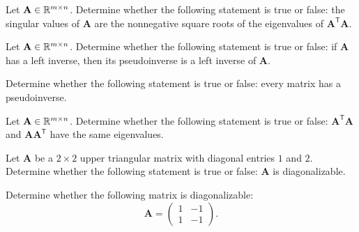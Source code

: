 \documentclass[11pt,oneside]{article}
\begin{document}
\begin{problem}
Let $\mathbf A\in\mathbb{R}^{m\times n}$. Determine whether the following statement is true or false: the singular values of $\mathbf A$ are the nonnegative square roots of the eigenvalues of $\mathbf A^{\mathsf T}\mathbf A$.
\end{problem}

\begin{problem}
Let $\mathbf A\in\mathbb{R}^{m\times n}$. Determine whether the following statement is true or false: if $\mathbf A$ has a left inverse, then its pseudoinverse is a left inverse of $\mathbf A$.
\end{problem}

\begin{problem}
Determine whether the following statement is true or false: every matrix has a pseudoinverse.
\end{problem}

\begin{problem}
Let $\mathbf A\in\mathbb{R}^{m\times n}$. Determine whether the following statement is true or false: $\mathbf A^{\mathsf T}\mathbf A$ and $\mathbf A\mathbf A^{\mathsf T}$ have the same eigenvalues.
\end{problem}

\begin{problem}
Let $\mathbf A$ be a $2\times2$ upper triangular matrix with diagonal entries $1$ and $2$. Determine whether the following statement is true or false: $\mathbf A$ is diagonalizable.
\end{problem}

\begin{problem}
Determine whether the following matrix is diagonalizable:
\[
\mathbf A=
\begin{pmatrix}
1&-1\\
1&-1
\end{pmatrix}.
\]
\end{problem}
\end{document}
